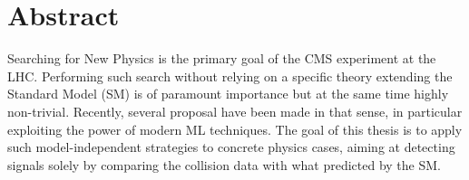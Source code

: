 \chapter*{Abstract}
Searching for New Physics is the primary goal of the CMS experiment at the LHC. Performing such search without relying on a
specific theory extending the Standard Model (SM) is of paramount importance but at the same time highly non-trivial. Recently,
several proposal have been made in that sense, in particular exploiting the power of modern ML techniques. The goal of this thesis is
to apply such model-independent strategies to concrete physics cases, aiming at detecting signals solely by comparing the collision
data with what predicted by the SM.
